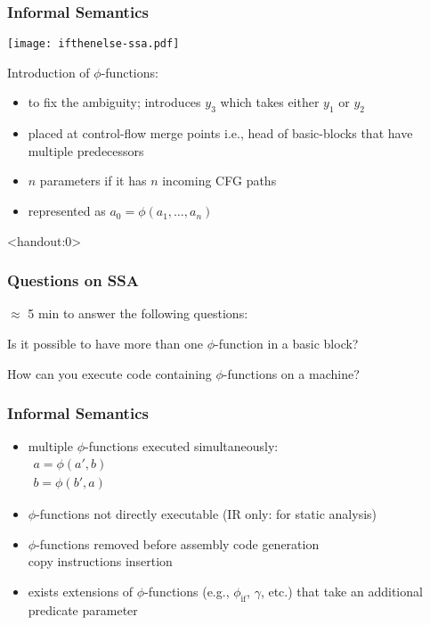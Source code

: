 \begin{frame}
\frametitle{Informal Semantics}
\texttt{[image: ifthenelse-ssa.pdf]}
\begin{minipage}[b]{0.5\textwidth}
  Introduction of $\phi$-functions:
\begin{itemize}
\item to fix the ambiguity; introduces $y_3$ which takes either $y_1$ or $y_2$
\item placed at control-flow merge points i.e., head of basic-blocks that have multiple predecessors
\end{itemize}
\vskip5mm
\end{minipage}
\begin{itemize}
\item $n$ parameters if it has $n$ incoming CFG paths
\item represented as $a_0=\phi(a_1, \dots, a_n)$
\end{itemize}
\end{frame}


\begin{frame}<handout:0>
  \frametitle{Questions on SSA}
  $\approx$ 5 min to answer the following questions:
  \begin{exampleblock}{}
    Is it possible to have more than one $\phi$-function in a basic block?
  \end{exampleblock}
  \begin{exampleblock}{}
    How can you execute code containing $\phi$-functions on a machine?
  \end{exampleblock}

\end{frame}

\begin{frame}
\frametitle{Informal Semantics}
\begin{itemize}
\item multiple $\phi$-functions executed simultaneously:\\ 
$
\begin{array}{l}
  a=\phi(a',b)\\
  b=\phi(b',a)
\end{array}
$
\item $\phi$-functions not directly executable (IR only: for static analysis)
\item $\phi$-functions removed before assembly code generation\\
  \handr copy instructions insertion
  \pause
\item exists extensions of $\phi$-functions (e.g., $\phi_{\textrm{if}}$, $\gamma$, etc.) that take an additional predicate parameter
\end{itemize}
\end{frame}

